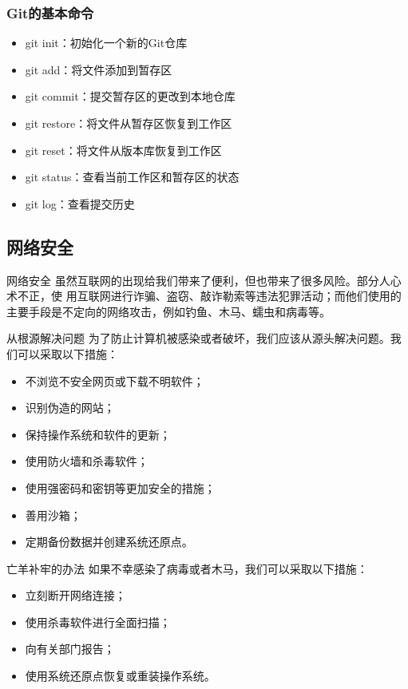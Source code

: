 \documentclass{beamer}
\begin{document}
\begin{frame}
    \frametitle{Git的基本命令}
    \begin{itemize}
        \item git init：初始化一个新的Git仓库
        \item git add：将文件添加到暂存区
        \item git commit：提交暂存区的更改到本地仓库
        \item git restore：将文件从暂存区恢复到工作区
        \item git reset：将文件从版本库恢复到工作区
        \item git status：查看当前工作区和暂存区的状态
        \item git log：查看提交历史
    \end{itemize}
\end{frame}
\subsection{网络安全}

\begin{frame}{网络安全}
    虽然互联网的出现给我们带来了便利，但也带来了很多风险。部分人心术不正，使
    用互联网进行诈骗、盗窃、敲诈勒索等违法犯罪活动；而他们使用的主要手段是不定向的网络攻击，例如钓鱼、木马、蠕虫和病毒等。
\end{frame}

\begin{frame}{从根源解决问题}
    为了防止计算机被感染或者破坏，我们应该从源头解决问题。我们可以采取以下措施：
    \begin{itemize}
        \item <2->不浏览不安全网页或下载不明软件；
        \item <3->识别伪造的网站；
        \item <4->保持操作系统和软件的更新；
        \item <5->使用防火墙和杀毒软件；
        \item <6->使用强密码和密钥等更加安全的措施；
        \item <7->善用沙箱；
        \item <8->定期备份数据并创建系统还原点。
    \end{itemize}
\end{frame}

\begin{frame}{亡羊补牢的办法}
    如果不幸感染了病毒或者木马，我们可以采取以下措施：
    \begin{itemize}
        \item <2->立刻断开网络连接；
        \item <3->使用杀毒软件进行全面扫描；
        \item <4->向有关部门报告；
        \item <5->使用系统还原点恢复或重装操作系统。
    \end{itemize}
\end{frame}
\end{document}
